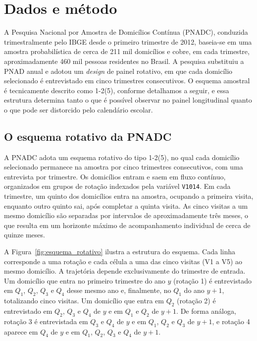 
\section{Dados e método}
\label{sec:dados_metodo}

A Pesquisa Nacional por Amostra de Domicílios Contínua (PNADC),
conduzida trimestralmente pelo IBGE desde o primeiro trimestre de
2012, baseia-se em uma amostra probabilística de cerca de 211 mil
domicílios e cobre, em cada trimestre, aproximadamente 460 mil
pessoas residentes no Brasil. A pesquisa substituiu a PNAD anual e
adotou um \emph{design} de painel rotativo, em que cada domicílio
selecionado é entrevistado em cinco trimestres consecutivos. O
esquema amostral é tecnicamente descrito como 1-2(5), conforme
detalhamos a seguir, e essa estrutura determina tanto o que é
possível observar no painel longitudinal quanto o que pode ser
distorcido pelo calendário escolar.

\subsection{O esquema rotativo da PNADC}
\label{ssec:rotativo}

A PNADC adota um esquema rotativo do tipo 1-2(5), no qual cada
domicílio selecionado permanece na amostra por cinco trimestres
consecutivos, com uma entrevista por trimestre. Os domicílios entram
e saem em fluxo contínuo, organizados em grupos de rotação indexados
pela variável \texttt{V1014}. Em cada trimestre, um quinto dos
domicílios entra na amostra, ocupando a primeira visita, enquanto
outro quinto sai, após completar a quinta visita. As cinco visitas
a um mesmo domicílio são separadas por intervalos de aproximadamente
três meses, o que resulta em um horizonte máximo de acompanhamento
individual de cerca de quinze meses.

A Figura~\ref{fig:esquema_rotativo} ilustra a estrutura do esquema.
Cada linha corresponde a uma rotação e cada célula a uma das cinco
visitas (V1 a V5) ao mesmo domicílio. A trajetória depende
exclusivamente do trimestre de entrada. Um domicílio que entra no
primeiro trimestre do ano $y$ (rotação 1) é entrevistado em $Q_1$,
$Q_2$, $Q_3$ e $Q_4$ desse mesmo ano e, finalmente, no $Q_1$ do
ano $y+1$, totalizando cinco visitas. Um domicílio que entra em
$Q_2$ (rotação 2) é entrevistado em $Q_2$, $Q_3$ e $Q_4$ de $y$ e
em $Q_1$ e $Q_2$ de $y+1$. De forma análoga, rotação 3 é
entrevistada em $Q_3$ e $Q_4$ de $y$ e em $Q_1$, $Q_2$ e $Q_3$ de
$y+1$, e rotação 4 aparece em $Q_4$ de $y$ e em $Q_1$, $Q_2$,
$Q_3$ e $Q_4$ de $y+1$.

